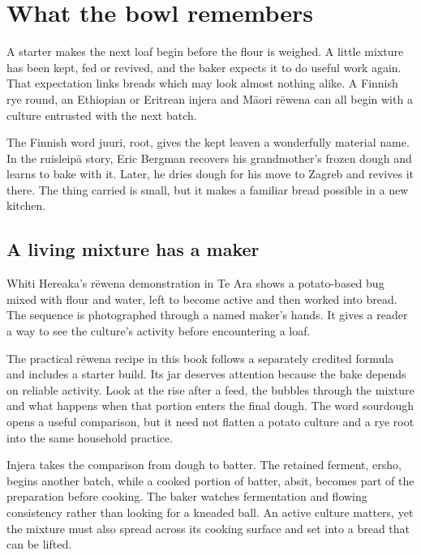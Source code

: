 \chapter{What the bowl remembers}\label{connection:ferments}

A starter makes the next loaf begin before the flour is weighed. A little mixture has been kept, fed or revived, and the baker expects it to do useful work again. That expectation links breads which may look almost nothing alike. A Finnish rye round, an Ethiopian or Eritrean injera and Māori rēwena can all begin with a culture entrusted with the next batch.

The Finnish word juuri, root, gives the kept leaven a wonderfully material name. In the ruisleipä story, Eric Bergman recovers his grandmother's frozen dough and learns to bake with it. Later, he dries dough for his move to Zagreb and revives it there. The thing carried is small, but it makes a familiar bread possible in a new kitchen.\citep{finroot,finjourney}

\section{A living mixture has a maker}
Whiti Hereaka's rēwena demonstration in Te Ara shows a potato-based bug mixed with flour and water, left to become active and then worked into bread. The sequence is photographed through a named maker's hands. It gives a reader a way to see the culture's activity before encountering a loaf.\citep{rewena}

The practical rēwena recipe in this book follows a separately credited formula and includes a starter build. Its jar deserves attention because the bake depends on reliable activity. Look at the rise after a feed, the bubbles through the mixture and what happens when that portion enters the final dough. The word sourdough opens a useful comparison, but it need not flatten a potato culture and a rye root into the same household practice.

Injera takes the comparison from dough to batter. The retained ferment, ersho, begins another batch, while a cooked portion of batter, absit, becomes part of the preparation before cooking. The baker watches fermentation and flowing consistency rather than looking for a kneaded ball. An active culture matters, yet the mixture must also spread across its cooking surface and set into a bread that can be lifted.\citep{maskalstarter,maskalinjera}

